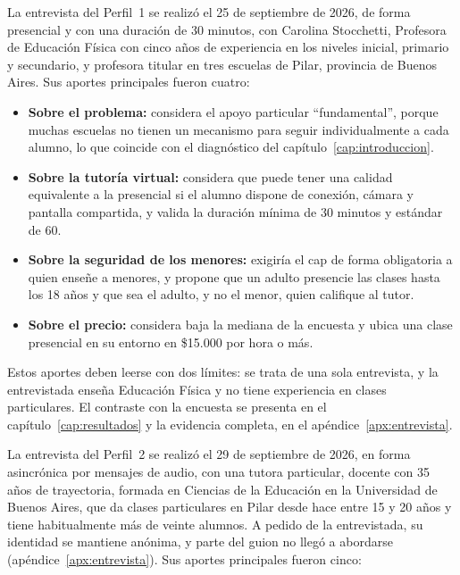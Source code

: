La entrevista del Perfil~1 se realizó el 25 de septiembre de 2026, de
forma presencial y con una duración de 30 minutos, con Carolina
Stocchetti, Profesora de Educación Física con cinco años de experiencia
en los niveles inicial, primario y secundario, y profesora titular en
tres escuelas de Pilar, provincia de Buenos Aires. Sus aportes
principales fueron cuatro:

\begin{itemize}
    \item \textbf{Sobre el problema:} considera el apoyo particular
          ``fundamental'', porque muchas escuelas no tienen un mecanismo
          para seguir individualmente a cada alumno, lo que coincide con
          el diagnóstico del capítulo~\ref{cap:introduccion}.
    \item \textbf{Sobre la tutoría virtual:} considera que puede tener una
          calidad equivalente a la presencial si el alumno dispone de
          conexión, cámara y pantalla compartida, y valida la duración
          mínima de 30 minutos y estándar de 60.
    \item \textbf{Sobre la seguridad de los menores:} exigiría el
          \gls{cap} de forma obligatoria a quien enseñe a menores, y
          propone que un adulto presencie las clases hasta los 18 años y
          que sea el adulto, y no el menor, quien califique al tutor.
    \item \textbf{Sobre el precio:} considera baja la mediana de la
          encuesta y ubica una clase presencial en su entorno en
          \$15.000 por hora o más.
\end{itemize}

Estos aportes deben leerse con dos límites: se trata de una sola
entrevista, y la entrevistada enseña Educación Física y no tiene
experiencia en clases particulares. El contraste con la encuesta se
presenta en el capítulo~\ref{cap:resultados} y la evidencia completa, en
el apéndice~\ref{apx:entrevista}.

La entrevista del Perfil~2 se realizó el 29 de septiembre de 2026, en
forma asincrónica por mensajes de audio, con una tutora particular,
docente con 35 años
de trayectoria, formada en Ciencias de la Educación en la Universidad de
Buenos Aires, que da clases particulares en Pilar desde hace entre 15 y
20 años y tiene habitualmente más de veinte alumnos. A pedido de la
entrevistada, su identidad se mantiene anónima, y parte del
guion no llegó a abordarse (apéndice~\ref{apx:entrevista}). Sus aportes
principales fueron cinco:

